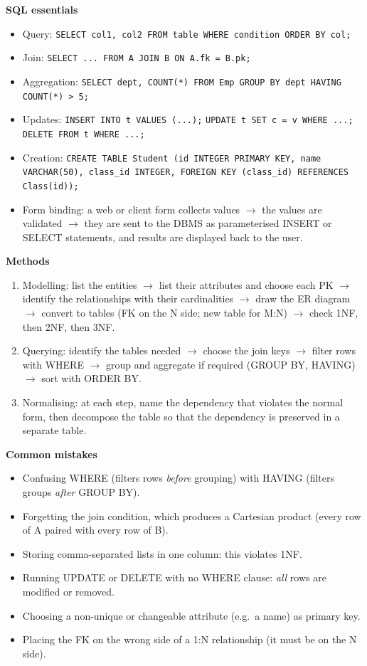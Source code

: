 \documentclass[11pt]{article}
\begin{document}
\begin{bilan}
\textbf{SQL essentials}
\begin{itemize}
\item Query: \texttt{SELECT col1, col2 FROM table WHERE condition ORDER BY col;}
\item Join: \texttt{SELECT ... FROM A JOIN B ON A.fk = B.pk;}
\item Aggregation: \texttt{SELECT dept, COUNT(*) FROM Emp GROUP BY dept HAVING COUNT(*) > 5;}
\item Updates: \texttt{INSERT INTO t VALUES (...);} \quad \texttt{UPDATE t SET c = v WHERE ...;} \quad \texttt{DELETE FROM t WHERE ...;}
\item Creation: \texttt{CREATE TABLE Student (id INTEGER PRIMARY KEY, name VARCHAR(50), class\_id INTEGER, FOREIGN KEY (class\_id) REFERENCES Class(id));}
\item Form binding: a web or client form collects values $\to$ the values are validated $\to$ they are sent to the DBMS as parameterised INSERT or SELECT statements, and results are displayed back to the user.
\end{itemize}

\textbf{Methods}
\begin{enumerate}
\item Modelling: list the entities $\to$ list their attributes and choose each PK $\to$ identify the relationships with their cardinalities $\to$ draw the ER diagram $\to$ convert to tables (FK on the N side; new table for M:N) $\to$ check 1NF, then 2NF, then 3NF.
\item Querying: identify the tables needed $\to$ choose the join keys $\to$ filter rows with WHERE $\to$ group and aggregate if required (GROUP BY, HAVING) $\to$ sort with ORDER BY.
\item Normalising: at each step, name the dependency that violates the normal form, then decompose the table so that the dependency is preserved in a separate table.
\end{enumerate}

\textbf{Common mistakes}
\begin{itemize}
\item Confusing WHERE (filters rows \emph{before} grouping) with HAVING (filters groups \emph{after} GROUP BY).
\item Forgetting the join condition, which produces a Cartesian product (every row of A paired with every row of B).
\item Storing comma-separated lists in one column: this violates 1NF.
\item Running UPDATE or DELETE with no WHERE clause: \emph{all} rows are modified or removed.
\item Choosing a non-unique or changeable attribute (e.g.\ a name) as primary key.
\item Placing the FK on the wrong side of a 1:N relationship (it must be on the N side).
\end{itemize}


\end{bilan}
\end{document}

